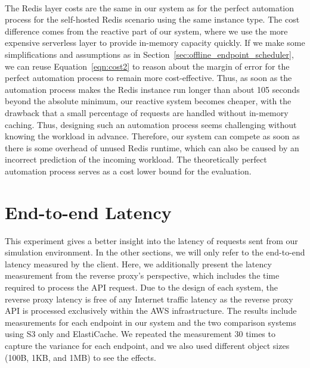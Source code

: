 ~\\
The Redis layer costs are the same in our system as for the perfect automation process for the self-hosted Redis scenario using the same instance type. The cost difference comes from the reactive part of our system, where we use the more expensive serverless layer to provide in-memory capacity quickly. If we make some simplifications and assumptions as in Section~\ref{sec:offline_endpoint_scheduler}, we can reuse Equation~\ref{eqn:cost2} to reason about the margin of error for the perfect automation process to remain more cost-effective. Thus, as soon as the automation process makes the Redis instance run longer than about 105 seconds beyond the absolute minimum, our reactive system becomes cheaper, with the drawback that a small percentage of requests are handled without in-memory caching. Thus, designing such an automation process seems challenging without knowing the workload in advance. Therefore, our system can compete as soon as there is some overhead of unused Redis runtime, which can also be caused by an incorrect prediction of the incoming workload. The theoretically perfect automation process serves as a cost lower bound for the evaluation.


\section{End-to-end Latency}
\label{subsec:end_to_end_latency}
This experiment gives a better insight into the latency of requests sent from our simulation environment. In the other sections, we will only refer to the end-to-end latency measured by the client. Here, we additionally present the latency measurement from the reverse proxy's perspective, which includes the time required to process the API request. Due to the design of each system, the reverse proxy latency is free of any Internet traffic latency as the reverse proxy API is processed exclusively within the AWS infrastructure. The results include measurements for each endpoint in our system and the two comparison systems using S3 only and ElastiCache. We repeated the measurement 30 times to capture the variance for each endpoint, and we also used different object sizes (100B, 1KB, and 1MB) to see the effects.

